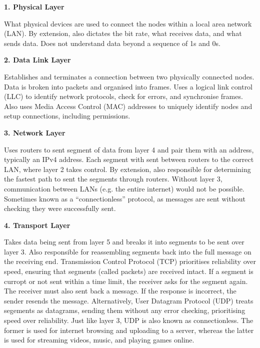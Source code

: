 \documentclass[11pt]{article}
\begin{document}
{\setlength{\parindent}{0cm}
\vspace{\baselineskip}
\textbf{1. Physical Layer}

What physical devices are used to connect the nodes within a local area network (LAN). By extension, also dictates the bit rate, what receives data, and what sends data. Does not understand data beyond a sequence of 1s and 0s.

\vspace{\baselineskip}
\textbf{2. Data Link Layer}

Establishes and terminates a connection between two physically connected nodes. Data is broken into packets and organised into frames. Uses a logical link control (LLC) to identify network protocols, check for errors, and synchronise frames. Also uses Media Access Control (MAC) addresses to uniquely identify nodes and setup connections, including permissions.

\vspace{\baselineskip}
\textbf{3. Network Layer}

Uses routers to sent segment of data from layer 4 and pair them with an address, typically an IPv4 address. Each segment with sent between routers to the correct LAN, where layer 2 takes control. By extension, also responsible for determining the fastest path to sent the segments through routers. Without layer 3, communication between LANs (e.g. the entire internet) would not be possible. Sometimes known as a ``connectionless'' protocol, as messages are sent without checking they were successfully sent.

\vspace{\baselineskip}
\textbf{4. Transport Layer}

Takes data being sent from layer 5 and breaks it into segments to be sent over layer 3. Also responsible for reassembling segments back into the full message on the receiving end. Transmission Control Protocol (TCP) prioritises reliability over speed, ensuring that segments (called packets) are received intact. If a segment is curropt or not sent within a time limit, the receiver asks for the segment again. The receiver must also sent back a message. If the response is incorrect, the sender resends the message. Alternatively, User Datagram Protocol (UDP) treats segements as datagrams, sending them without any error checking, prioritising speed over reliability. Just like layer 3, UDP is also known as connectionless. The former is used for internet browsing and uploading to a server, whereas the latter is used for streaming videos, music, and playing games online.

}
\end{document}
